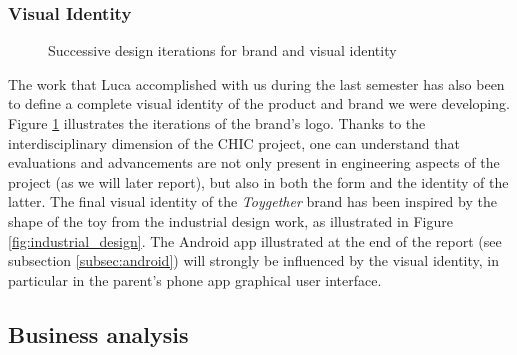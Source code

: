 \subsubsection{Visual Identity}

\begin{figure}[H]
    \centering
    \hfill
    \hfill
    \caption{Successive design iterations for brand and visual identity } 
    \label{fig:logo}
\end{figure}

\medskip
The work that Luca accomplished with us during the last semester has also been to define a complete visual identity of the product and brand we were developing. Figure \ref{fig:logo} illustrates the iterations of the brand's logo. Thanks to the interdisciplinary dimension of the CHIC project, one can understand that evaluations and advancements are not only present in engineering aspects of the project (as we will later report), but also in both the form and the identity of the latter. The final visual identity of the \textit{Toygether} brand has been inspired by the shape of the toy from the industrial design work, as illustrated in Figure \ref{fig:industrial_design}. The Android app illustrated at the end of the report (see subsection \ref{subsec:android}) will strongly be influenced by the visual identity, in particular in the parent's phone app graphical user interface.

\subsection{Business analysis}

